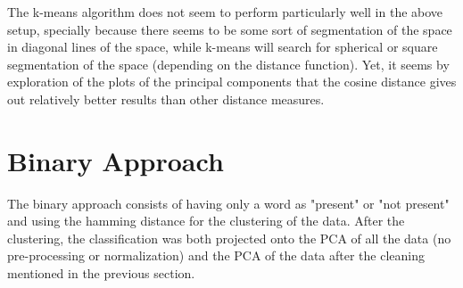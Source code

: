 \documentclass[a4paper,10pt]{article}
\begin{document}
The k-means algorithm does not seem to perform particularly well in the above setup, specially because there seems to be some sort of segmentation of the space in diagonal lines of the space, while k-means will search for spherical or square segmentation of the space (depending on the distance function). Yet, it seems by exploration of the plots of the principal components that the cosine distance gives out relatively better results than other distance measures.



\section{Binary Approach}
The binary approach consists of having only a word as "present" or "not present" and using the hamming distance for the clustering of the data. After the clustering, the classification was both projected onto the PCA of all the data (no pre-processing or normalization) and the PCA of the data after the cleaning mentioned in the previous section.
\end{document}
